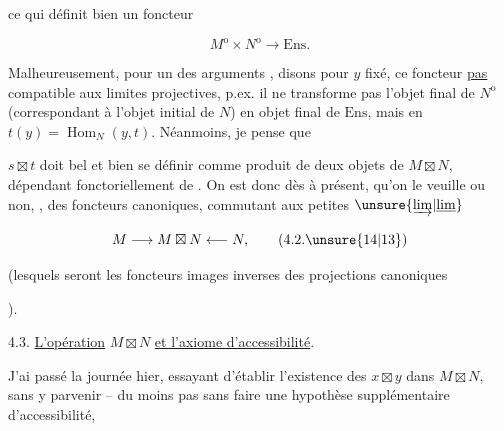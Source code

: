 
ce qui définit bien un foncteur

\[
M^{\mathrm{o}}\times N^{\mathrm{o}}\longrightarrow\mathrm{Ens}.
\]

Malheureusement, pour un des arguments , disons pour $y$ fixé,  ce foncteur  \uline{pas}  compatible aux limites projectives, p.ex. il ne transforme pas l'objet final de $N^{\mathrm{o}}$ (correspondant à l'objet initial de $N$) en objet final de $\mathrm{Ens}$, mais en  $t(y)=\operatorname{Hom}_{N}(y,t)$. Néanmoins, je pense que


$s\boxtimes t$ doit bel et bien se définir comme produit de deux objets de $M\boxtimes N$, dépendant fonctoriellement de . On est donc  dès à présent, qu'on le veuille ou non, ,  des foncteurs canoniques, commutant aux petites $\unsure{\underrightarrow{\lim}|\underline{\lim}}$

\[
M\longrightarrow M\boxtimes N\longleftarrow N,
\tag*{(4.2.\unsure{14|13})}
\]


(lesquels seront les foncteurs images inverses des projections canoniques


).

4.3. \uline{L'opération} $M\boxtimes N$ \uline{et l'axiome d'accessibilité}.

J'ai passé la journée hier, essayant d'établir l'existence des $x\boxtimes y$ dans $M\boxtimes N$, sans y parvenir -- du moins pas sans faire  une hypothèse supplémentaire d'accessibilité,
